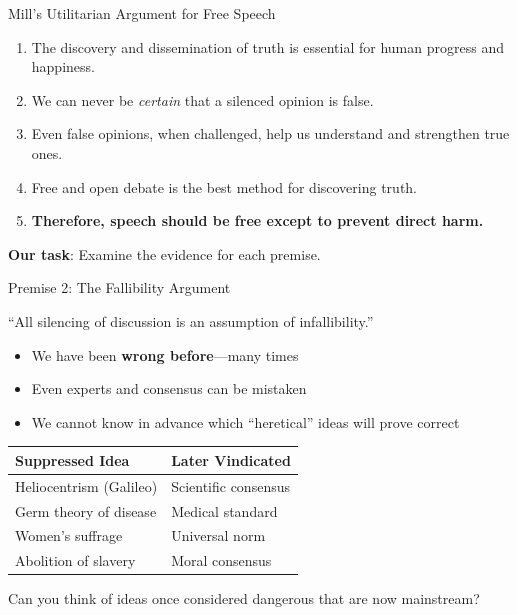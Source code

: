 ﻿\documentclass[aspectratio=169,11pt]{beamer}
\begin{document}
\begin{frame}{Mill's Utilitarian Argument for Free Speech}
\begin{argumentbox}
\begin{enumerate}
    \item The discovery and dissemination of truth is essential for human progress and happiness.
    \item We can never be \textit{certain} that a silenced opinion is false.
    \item Even false opinions, when challenged, help us understand and strengthen true ones.
    \item Free and open debate is the best method for discovering truth.
    \item[\textbf{C.}] \textbf{Therefore, speech should be free except to prevent direct harm.}
\end{enumerate}
\end{argumentbox}

\vspace{0.3cm}
\textbf{Our task}: Examine the evidence for each premise.
\end{frame}

\begin{frame}[shrink=8]{Premise 2: The Fallibility Argument}
\begin{quotebox}[Mill]
``All silencing of discussion is an assumption of infallibility.''
\end{quotebox}

\vspace{0.2cm}
\begin{itemize}
    \item We have been \textbf{wrong before}---many times
    \item Even experts and consensus can be mistaken
    \item We cannot know in advance which ``heretical'' ideas will prove correct
\end{itemize}

\vspace{0.2cm}
\begin{table}[h]
\centering
\small
\begin{tabular}{l l}
\toprule
\textbf{Suppressed Idea} & \textbf{Later Vindicated} \\
\midrule
Heliocentrism (Galileo) & Scientific consensus \\
Germ theory of disease & Medical standard \\
Women's suffrage & Universal norm \\
Abolition of slavery & Moral consensus \\
\bottomrule
\end{tabular}
\end{table}

\begin{discussionbox}[Discussion]
Can you think of ideas once considered dangerous that are now mainstream?
\end{discussionbox}
\end{frame}
\end{document}
